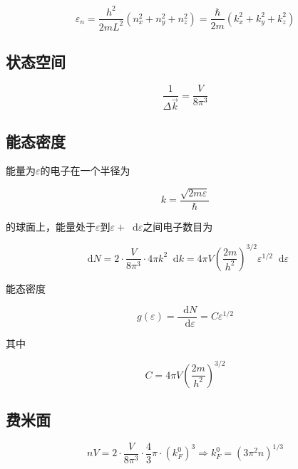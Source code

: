 \documentclass{article}
\newcommand*{\md}{\mathop{}\!\mathrm{d}}
\begin{document}
\begin{multicols}{2}
\begin{equation*}
  \varepsilon_n = \dfrac{h^2}{2mL^2} \left( n_x^2 + n_y^2 + n_z^2 \right) = \dfrac{\hbar}{2m} \left( k_x^2 + k_y^2 + k_z^2 \right) 
\end{equation*}

\subsection{状态空间}

\begin{equation*}
  \dfrac{1}{\Delta \vec{k}} = \dfrac{V}{8\pi^3}
\end{equation*}

\subsection{能态密度}

能量为$\varepsilon$的电子在一个半径为

\begin{equation*}
  k = \dfrac{\sqrt{2m\varepsilon} }{\hbar}
\end{equation*}

的球面上，能量处于$\varepsilon$到$\varepsilon + \md \varepsilon$之间电子数目为

\begin{equation*}
  \md N = 2\cdot \dfrac{V}{8\pi^3}\cdot 4\pi k^2 \md k = 4\pi V \left( \dfrac{2m}{h^2} \right)^{3/2} \varepsilon^{1/2} \md \varepsilon
\end{equation*}

能态密度

\begin{equation*}
  g \left( \varepsilon \right) = \dfrac{\md N}{\md \varepsilon} = C \varepsilon^{1/2}
\end{equation*}

其中

\begin{equation*}
  C = 4\pi V \left( \dfrac{2m}{h^2} \right)^{3/2}
\end{equation*}

\subsection{费米面}

\begin{equation*}
  nV = 2\cdot \dfrac{V}{8\pi^3}\cdot \dfrac{4}{3} \pi \cdot \left( k_F^0 \right)^3 \Rightarrow k_F^0 = \left( 3\pi^2 n \right)^{1/3}
\end{equation*}


\end{multicols}
\end{document}
